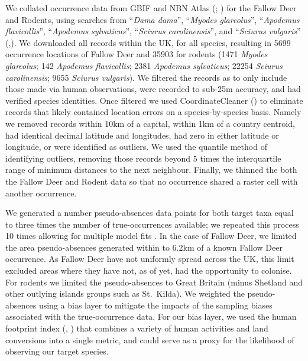 \documentclass[10pt,a4paper]{article}
\begin{document}
We collated occurrence data from GBIF and NBN Atlas (; ) for the Fallow Deer and Rodents, using searches from ``\emph{Dama dama}'', ``\emph{Myodes glareolus}'', ``\emph{Apodemus flavicollis}'', ``\emph{Apodemus sylvaticus}'', ``\emph{Sciurus carolinensis}'', and ``\emph{Sciurus vulgaris}'' (,).
We downloaded all records within the UK, for all species, resulting in 5699 occurrence locations of Fallow Deer and 35903 for rodents (1471 \emph{Myodes glareolus}; 142 \emph{Apodemus flavicollis}; 2381 \emph{Apodemus sylvaticus}; 22254 \emph{Sciurus carolinensis}; 9655 \emph{Sciurus vulgaris}).
We filtered the records as to only include those made via human observations, were recorded to sub-25m accuracy, and had verified species identities.
Once filtered we used CoordinateCleaner () to eliminate records that likely contained location errors on a species-by-species basis.
Namely we removed records within 10km of a capital, within 1km of a country centroid, had identical decimal latitude and longitudes, had zero in either latitude or longitude, or were identified as outliers.
We used the quantile method of identifying outliers, removing those records beyond 5 times the interquartile range of minimum distances to the next neighbour.
Finally, we thinned the both the Fallow Deer and Rodent data so that no occurrence shared a raster cell with another occurrence.

We generated a number pseudo-absences data points for both target taxa equal to three times the number of true-occurrences available; we repeated this process 10 times allowing for multiple model fits .
In the case of Fallow Deer, we limited the area pseudo-absences generated within to 6.2km of a known Fallow Deer occurrence.
As Fallow Deer have not uniformly spread across the UK, this limit excluded areas where they have not, as of yet, had the opportunity to colonise.
For rodents we limited the pseudo-absences to Great Britain (minus Shetland and other outlying islands groups such as St.~Kilda).
We weighted the pseudo-absences using a bias layer to mitigate the impacts of the sampling biases associated with the true-occurrence data.
For our bias layer, we used the human footprint index (, ) that combines a variety of human activities and land conversions into a single metric, and could serve as a proxy for the likelihood of observing our target species.
\end{document}
